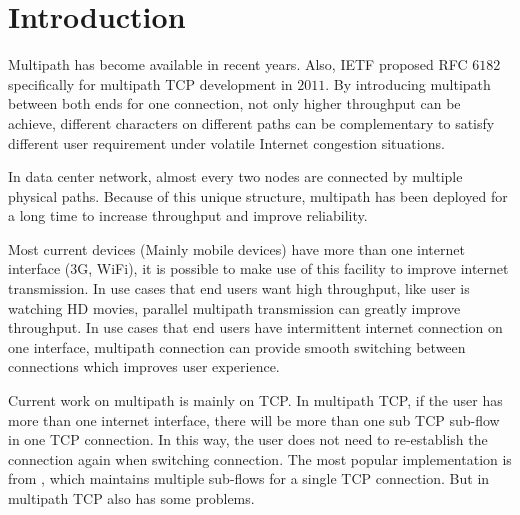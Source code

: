 \section{Introduction}
\label{sec:intro}
Multipath has become available in recent years. Also, IETF proposed RFC $6182$ specifically for multipath TCP development in $2011$. By introducing multipath between both ends for one connection, not only higher throughput can be achieve, different characters on different paths can be complementary to satisfy different user requirement under volatile Internet congestion situations.

In data center network, almost every two nodes are connected by multiple physical paths. Because of this unique structure, multipath has been deployed for a long time to increase throughput and improve reliability.

Most current devices (Mainly mobile devices) have more than one internet interface ($3$G, WiFi), it is possible to make use of this facility to improve internet transmission. In use cases that end users want high throughput, like user is watching HD movies, parallel multipath transmission can greatly improve throughput. In use cases that end users have intermittent internet connection on one interface, multipath connection can provide smooth switching between connections which improves user experience.	


Current work on multipath is mainly on TCP. In multipath TCP, if the user has more than one internet interface, there will be more than one sub TCP sub-flow in one TCP connection. In this way, the user does not need to re-establish the connection again when switching connection. The most popular implementation is from \cite{mptcp}, which maintains multiple sub-flows for a single TCP connection. But in multipath TCP also has some problems. 


